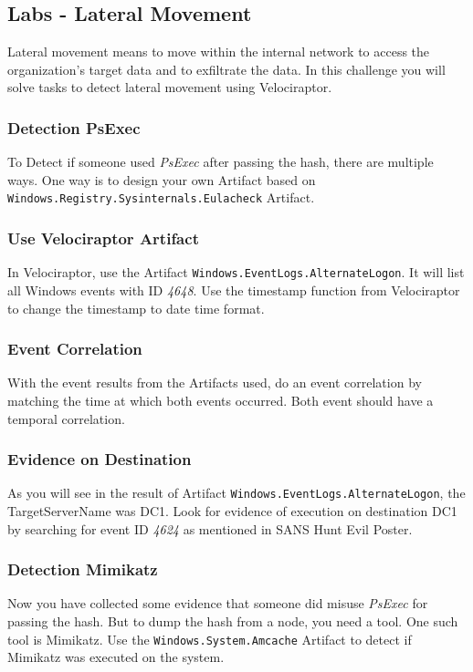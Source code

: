 \subsection{Labs - Lateral Movement}
Lateral movement means to move within the internal network to access the organization's target data and to exfiltrate the data. In this challenge you will solve tasks to detect lateral movement using Velociraptor.

\subsubsection{Detection PsExec}
To Detect if someone used \textit{PsExec} after passing the hash, there are multiple ways. One way is to design your own Artifact based on \lstinline|Windows.Registry.Sysinternals.Eulacheck| Artifact.

\subsubsection{Use Velociraptor Artifact}
In Velociraptor, use the Artifact \lstinline|Windows.EventLogs.AlternateLogon|. It will list all Windows events with ID \textit{4648}. Use the timestamp function from Velociraptor to change the timestamp to date time format.

\subsubsection{Event Correlation}
With the event results from the Artifacts used, do an event correlation by matching the time at which both events occurred. Both event should have a temporal correlation.

\subsubsection{Evidence on Destination}
As you will see in the result of Artifact \lstinline|Windows.EventLogs.AlternateLogon|, the TargetServerName was DC1. Look for evidence of execution on destination DC1 by searching for event ID \textit{4624} as mentioned in SANS Hunt Evil Poster.

\subsubsection{Detection Mimikatz}
Now you have collected some evidence that someone did misuse \textit{PsExec} for passing the hash. But to dump the hash from a node, you need a tool. One such tool is Mimikatz. Use the \lstinline|Windows.System.Amcache| Artifact to detect if Mimikatz was executed on the system.